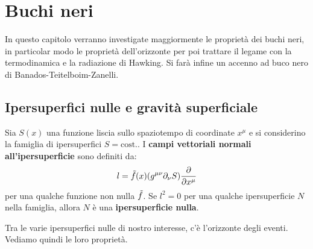 \chapter{Buchi neri}
In questo capitolo verranno investigate maggiormente le proprietà dei buchi neri, in particolar modo le proprietà dell'orizzonte per poi trattare il legame con la termodinamica e la radiazione di Hawking. Si farà infine un accenno ad buco nero di Banados-Teitelboim-Zanelli.
\section{Ipersuperfici nulle e gravità superficiale}
\begin{definizione}
Sia $S(x)$ una funzione liscia sullo spaziotempo di coordinate $x^\mu$ e si considerino la famiglia di ipersuperfici $S = \textrm{cost.}$. I \textbf{campi vettoriali normali all'ipersuperficie} sono definiti da:
\begin{equation}
    l = \Tilde{f}(x)(g^{\mu\nu}\partial_\nu S) \frac{\partial}{\partial x^\mu}
    \label{eq.vettore_normale_ipersup}
\end{equation}
per una qualche funzione non nulla $\Tilde{f}$. Se $l^2 = 0$ per una qualche ipersuperficie $N$ nella famiglia, allora $N$ è una \textbf{ipersuperficie nulla}.
\end{definizione}
Tra le varie ipersuperfici nulle di nostro interesse, c'è l'orizzonte degli eventi. Vediamo quindi le loro proprietà.

